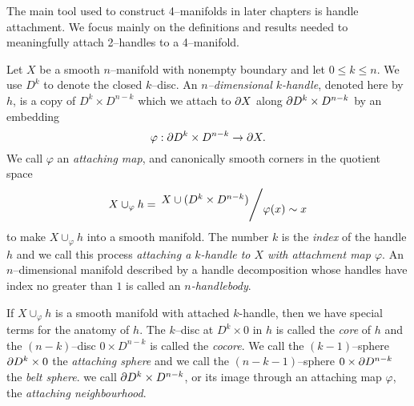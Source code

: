 The main tool used to construct 4--manifolds in later chapters is handle attachment.
We focus mainly on the definitions and results needed to meaningfully attach 2--handles to a 4--manifold.



\begin{defn}
	\label{def:handle}
	Let $X$ be a smooth $n$--manifold with nonempty boundary and let $0\leq k\leq n$.
	We use $D^k$ to denote the closed $k$--disc.
	An \emph{$n$--dimensional $k$-handle}, denoted here by $h$, is a copy of $D^k\times D^{n-k}$ which we attach to $\partial X$ along $\partial D^k\times D^{n-k}$ by an embedding
	\[
	  \varphi : \partial D^k \times D^{n-k} \to \partial X.
	\]
	We call $\varphi$ an \emph{attaching map}, and canonically smooth corners \cite{GompStip} in the quotient space
	\[
	  X\cup_\varphi h = \quotient{X \cup ( D^k\times D^{n-k} ) }{ \varphi(x) \sim x }
	\]
	to make $X\cup_\varphi h$ into a smooth manifold.
	The number $k$ is the \emph{index} of the handle $h$ and we call this process \emph{attaching a $k$-handle to $X$ with attachment map $\varphi$}.
	An $n$--dimensional manifold described by a handle decomposition whose handles have index no greater than $1$ is called an \emph{$n$-handlebody}.
\end{defn}

If $X\cup_\varphi h$ is a smooth manifold with attached $k$-handle, then we have special terms for the anatomy of $h$.
The $k$--disc at $D^k\times 0$ in $h$ is called the \emph{core} of $h$ and the $(n-k)$--disc $0 \times D^{n-k}$ is called the \emph{cocore}.
We call the $(k-1)$--sphere $\partial D^k \times 0$ the \emph{attaching sphere} and we call the $(n-k-1)$--sphere $ 0 \times \partial D^{n-k}$ the \emph{belt sphere}.
we call $\partial D^k\times D^{n-k}$, or its image through an attaching map $\varphi$, the \emph{attaching neighbourhood}.

